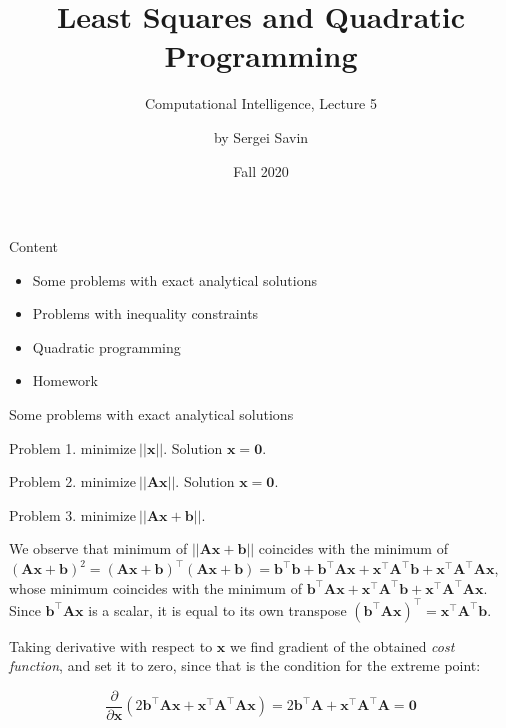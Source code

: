 \documentclass{beamer}
\title{Least Squares and Quadratic Programming}
\subtitle{Computational Intelligence, Lecture 5}
\author{by Sergei Savin}
\date{Fall 2020}
\begin{document}
\maketitle


\begin{frame}{Content}

\begin{itemize}
\item Some problems with exact analytical solutions
\item Problems with inequality constraints
\item Quadratic programming
\item Homework
\end{itemize}

\end{frame}



\begin{frame}{Some problems with exact analytical solutions}
\begin{flushleft}

Problem 1. $\text{minimize} \ ||\mathbf{x}||$. Solution $\mathbf{x} = \mathbf{0}$.

\bigskip

Problem 2. $\text{minimize} \ ||\mathbf{A}\mathbf{x}||$. Solution $\mathbf{x} = \mathbf{0}$.

\bigskip

Problem 3. $\text{minimize} \ ||\mathbf{A}\mathbf{x} + \mathbf{b}||$. 

\bigskip

We observe that minimum of $||\mathbf{A}\mathbf{x} + \mathbf{b}||$ coincides with the minimum of $(\mathbf{A}\mathbf{x} + \mathbf{b})^2 = (\mathbf{A}\mathbf{x} + \mathbf{b})^\top (\mathbf{A}\mathbf{x} + \mathbf{b}) = \mathbf{b}^\top\mathbf{b} + \mathbf{b}^\top\mathbf{A}\mathbf{x} + \mathbf{x}^\top\mathbf{A}^\top\mathbf{b} + \mathbf{x}^\top\mathbf{A}^\top\mathbf{A}\mathbf{x}$, whose minimum coincides with the minimum of $\mathbf{b}^\top\mathbf{A}\mathbf{x} + \mathbf{x}^\top\mathbf{A}^\top\mathbf{b} + \mathbf{x}^\top\mathbf{A}^\top\mathbf{A}\mathbf{x}$. Since $\mathbf{b}^\top\mathbf{A}\mathbf{x}$ is a scalar, it is equal to its own transpose $(\mathbf{b}^\top\mathbf{A}\mathbf{x})^\top = \mathbf{x}^\top\mathbf{A}^\top\mathbf{b}$.

Taking derivative with respect to $\mathbf{x}$ we find gradient of the obtained \emph{cost function}, and set it to zero, since that is the condition for the extreme point:

\begin{equation}
    \frac{\partial}{\partial \mathbf{x}} (2\mathbf{b}^\top\mathbf{A}\mathbf{x} + \mathbf{x}^\top\mathbf{A}^\top\mathbf{A}\mathbf{x}) = 2\mathbf{b}^\top\mathbf{A} + \mathbf{x}^\top\mathbf{A}^\top\mathbf{A} = \mathbf{0}
\end{equation}
 
\end{flushleft}
\end{frame}
\end{document}
